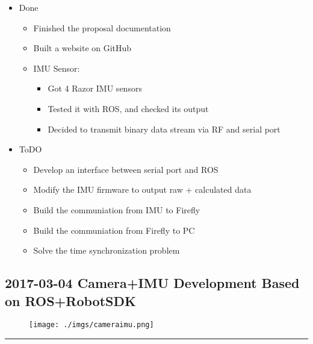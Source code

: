 \documentclass[letterpaper,12pt]{article}
\newcommand{\panhline}{\begin{center}\rule{\textwidth}{1pt}\end{center}}
\begin{document}
\begin{itemize}
	\item Done
	\begin{itemize}
		\item Finished the proposal documentation
		\item Built a website on GitHub
		\item IMU Sensor:
		\begin{itemize}
			\item Got 4 Razor IMU sensors
			\item Tested it with ROS, and checked its output
			\item Decided to transmit binary data stream via RF and serial port
		\end{itemize}
	\end{itemize}
	\item ToDO
	\begin{itemize}
		\item Develop an interface between serial port and ROS
		\item Modify the IMU firmware to output raw + calculated data
		\item Build the communiation from IMU to Firefly
		\item Build the communiation from Firefly to PC
		\item Solve the time synchronization problem		
	\end{itemize}
\end{itemize}

\subsection{2017-03-04 Camera+IMU Development Based on ROS+RobotSDK}

\begin{figure}[!h]
	\centering
	\texttt{[image: ./imgs/cameraimu.png]}
\end{figure}

\panhline
\end{document}
